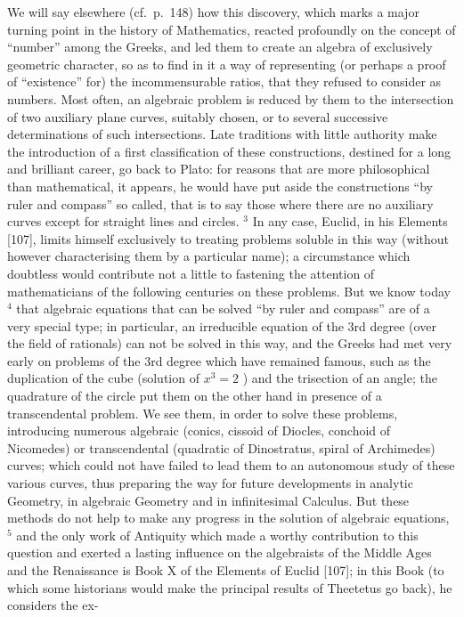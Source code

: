 We will say elsewhere (cf.~p.~148) how this discovery, which marks a major turning point in the history of Mathematics, reacted profoundly on the concept of ``number'' among the Greeks, and led them to create an algebra of exclusively geometric character, so as to find in it a way of representing (or perhaps a proof of ``existence'' for) the incommensurable ratios, that they refused to consider as numbers. Most often, an algebraic problem is reduced by them to the intersection of two auxiliary plane curves, suitably chosen, or to several successive determinations of such intersections. Late traditions with little authority make the introduction of a first classification of these constructions, destined for a long and brilliant career, go back to Plato: for reasons that are more philosophical than mathematical, it appears, he would have put aside the constructions ``by ruler and compass'' so called, that is to say those where there are no auxiliary curves except for straight lines and circles. \(^{3}\) In any case, Euclid, in his Elements {[}107{]}, limits himself exclusively to treating problems soluble in this way (without however characterising them by a particular name); a circumstance which doubtless would contribute not a little to fastening the attention of mathematicians of the following centuries on these problems. But we know today \(^{4}\) that algebraic equations that can be solved ``by ruler and compass'' are of a very special type; in particular, an irreducible equation of the 3rd degree (over the field of rationals) can not be solved in this way, and the Greeks had met very early on problems of the 3rd degree which have remained famous, such as the duplication of the cube (solution of \(x^{3}=2\) ) and the trisection of an angle; the quadrature of the circle put them on the other hand in presence of a transcendental problem. We see them, in order to solve these problems, introducing numerous algebraic (conics, cissoid of Diocles, conchoid of Nicomedes) or transcendental (quadratic of Dinostratus, spiral of Archimedes) curves; which could not have failed to lead them to an autonomous study of these various curves, thus preparing the way for future developments in analytic Geometry, in algebraic Geometry and in infinitesimal Calculus. But these methods do not help to make any progress in the solution of algebraic equations, \(^{5}\) and the only work of Antiquity which made a worthy contribution to this question and exerted a lasting influence on the algebraists of the Middle Ages and the Renaissance is Book X of the Elements of Euclid {[}107{]}; in this Book (to which some historians would make the principal results of Theetetus go back), he considers the ex-

